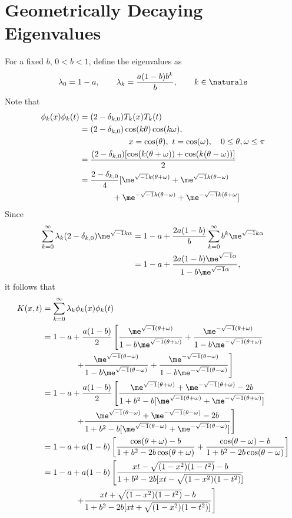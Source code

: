 \documentclass[]{elsarticle}
\theoremstyle{definition}
\begin{document}
\section{Geometrically Decaying Eigenvalues}
For a fixed $b$, $0<b<1$, define the eigenvalues as
\begin{equation}
\lambda_0=1-a, \qquad \lambda_k = \frac{a (1-b) b^{k}}{b}, \qquad k \in \naturals
\end{equation}
Note that
\begin{align}
\nonumber
\phi_k(x)\phi_k(t) & = (2-\delta_{k,0}) T_k(x)T_k(t) \\
\nonumber
&=(2-\delta_{k,0}) \cos(k\theta)\cos(k \omega), \\
\nonumber
&\qquad \qquad \qquad x=\cos(\theta), \ t =\cos(\omega), \quad 0 \le \theta,\omega \le \pi \\
&=\frac{(2-\delta_{k,0})[\cos(k(\theta+\omega)) + \cos(k(\theta-\omega))]}{2} \label{sumcos}\\
&=\frac{2-\delta_{k,0}}{4}[\me^{\sqrt{-1}k(\theta+\omega)} + \me^{\sqrt{-1}k(\theta-\omega) } \nonumber \\
& \qquad \qquad + \me^{-\sqrt{-1}k(\theta-\omega)} + \me^{-\sqrt{-1}k(\theta+\omega}]
\label{sumcompexp}
\end{align}
Since
\begin{align*}
\sum_{k=0}^{\infty} \lambda_k (2-\delta_{k,0}) \me^{\sqrt{-1}k\alpha}
&= 1-a + \frac{2a(1-b)}{b}\sum_{k=0}^{\infty} b^k \me^{\sqrt{-1}k\alpha} \\
&= 1-a + \frac{2a(1-b)\me^{\sqrt{-1}\alpha}} {1-b\me^{\sqrt{-1}\alpha}},
\end{align*}
it follows that
\begin{align*}
K(x,t) &= \sum_{k=0}^{\infty} \lambda_k \phi_k(x)\phi_k(t) \\
&= 1-a + \frac{a(1-b)}{2}\left[ \frac{\me^{\sqrt{-1}(\theta+\omega)}}{1-b\me^{\sqrt{-1}(\theta+\omega)}} + \frac{\me^{-\sqrt{-1}(\theta+\omega)}}{1-b\me^{-\sqrt{-1}(\theta+\omega)}} \right . \\
& \qquad \qquad \left . + \frac{\me^{\sqrt{-1}(\theta-\omega)}}{1-b\me^{\sqrt{-1}(\theta-\omega)}} + \frac{\me^{-\sqrt{-1}(\theta-\omega)}}{1-b\me^{-\sqrt{-1}(\theta-\omega)}}  \right] \\
&=  1-a + \frac{a(1-b)}{2} \left[ \frac{\me^{\sqrt{-1}(\theta+\omega)} + \me^{-\sqrt{-1}(\theta+\omega)} - 2b } {1+b^2 -b[\me^{\sqrt{-1}(\theta+\omega)} + \me^{-\sqrt{-1}(\theta+\omega)}] } \right . \\
& \qquad \qquad \left . + \frac{\me^{\sqrt{-1}(\theta-\omega)}+\me^{-\sqrt{-1}(\theta-\omega)} - 2b } {1+b^2 -b[\me^{\sqrt{-1}(\theta-\omega)} + \me^{-\sqrt{-1}(\theta-\omega)}] }  \right] \\
&= 1-a + a(1-b) \left[\frac{\cos(\theta+\omega)-b} {1+b^2 -2b\cos(\theta+\omega) } + \frac{\cos(\theta-\omega)-b} {1+b^2 -2b\cos(\theta-\omega) }  \right] \\
&= 1-a + a(1-b) \left[\frac{xt-\sqrt{(1-x^2)(1-t^2)}-b} {1+b^2 -2b[xt-\sqrt{(1-x^2)(1-t^2)}] } \right. \\
& \qquad \qquad \left .  + \frac{xt+\sqrt{(1-x^2)(1-t^2)}-b} {1+b^2 -2b[xt+\sqrt{(1-x^2)(1-t^2)}] }  \right] \\
\end{align*}
\end{document}

